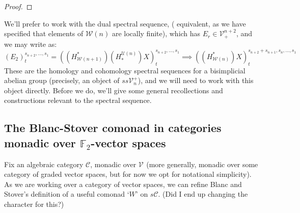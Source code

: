 \documentclass[11pt]{amsart}
\theoremstyle{plain}
\theoremstyle{definition}
\newcommand{\calW}{\mathcal{W}}
\newcommand{\calU}{\mathcal{U}}
\newcommand{\calC}{\mathcal{C}}
\newcommand{\calV}{\mathcal{V}}
\theoremstyle{plain}
\newcommand{\vect}[2]{\calV^{#1}_{#2}}
\newcommand{\F}{\mathbb{F}}
\begin{document}
\begin{Composite functor spectral sequences}
\begin{proof}
\end{proof}
We'll prefer to work with the dual spectral sequence, ( equivalent, as we have specified that elements of $\calW(n)$ are locally finite), which has $E_r\in\vect{n+2}{+}$, and we may write as:
\[(E_2)^{s_{n+2},\ldots,s_1}_t=((H^*_{\calW(n+1)})(H_*^{\calU(n)})X)^{s_{n+2},\ldots,s_1}_t\implies ((H^*_{\calW(n)})X)^{s_{n+2}+s_{n+1},s_n,\ldots,s_1}_t\]
These are the homology and cohomology spectral sequences for a bisimplicial abelian group (precisely, an object of $ss\vect{+}{n}$), and we will need to work with this object directly. Before we do, we'll give some general recollections and constructions relevant to the spectral sequence.

\subsection{The Blanc-Stover comonad in categories monadic over $\F_2$-vector spaces}
Fix an algebraic category $\calC$, monadic over $\vect{}{}$ (more generally, monadic over some category of graded vector spaces, but for now we opt for notational simplicity). As we are working over a category of vector spaces, we can refine Blanc and Stover's definition \cite{Blanc_Stover-Groth_SS.pdf} of a useful comonad `$W$' on $s\calC$. (Did I end up changing the character for this?)


\end{Composite functor spectral sequences}
\end{document}

